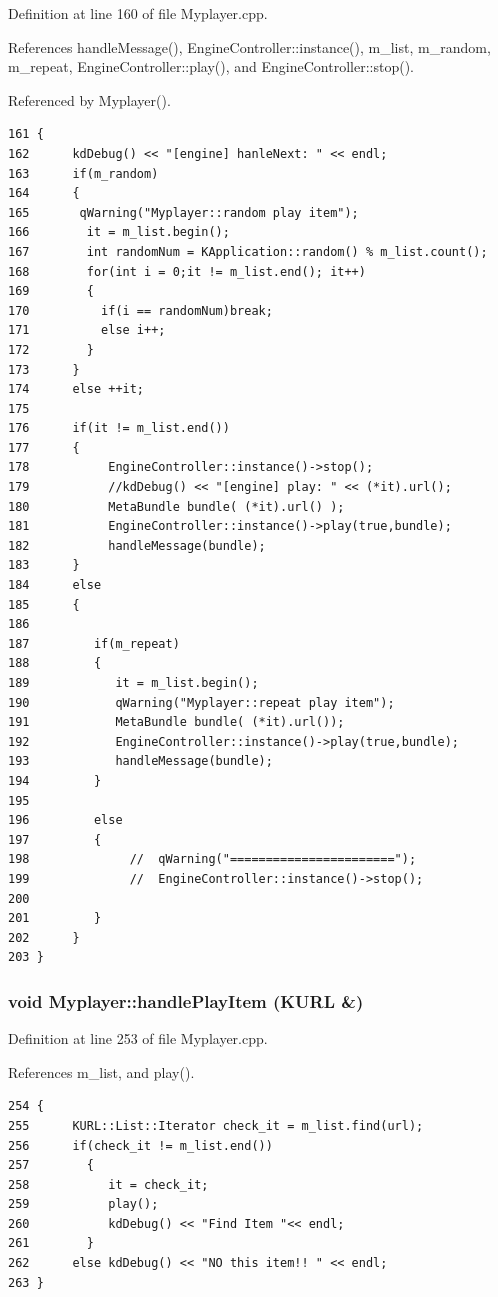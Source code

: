 Definition at line 160 of file Myplayer.cpp.

References handle\-Message(), Engine\-Controller::instance(), m\_\-list, m\_\-random, m\_\-repeat, Engine\-Controller::play(), and Engine\-Controller::stop().

Referenced by Myplayer().



\footnotesize\begin{verbatim}161 {
162      kdDebug() << "[engine] hanleNext: " << endl;
163      if(m_random)
164      {
165       qWarning("Myplayer::random play item");
166        it = m_list.begin();
167        int randomNum = KApplication::random() % m_list.count();
168        for(int i = 0;it != m_list.end(); it++)
169        {
170          if(i == randomNum)break;
171          else i++;
172        }
173      }
174      else ++it;
175    
176      if(it != m_list.end())
177      {
178           EngineController::instance()->stop();
179           //kdDebug() << "[engine] play: " << (*it).url();
180           MetaBundle bundle( (*it).url() );  
181           EngineController::instance()->play(true,bundle);     
182           handleMessage(bundle);
183      }
184      else
185      {
186         
187         if(m_repeat)
188         {
189            it = m_list.begin();
190            qWarning("Myplayer::repeat play item");
191            MetaBundle bundle( (*it).url());
192            EngineController::instance()->play(true,bundle);
193            handleMessage(bundle);
194         }
195         
196         else 
197         {      
198              //  qWarning("=======================");
199              //  EngineController::instance()->stop();  
200            
201         }
202      }
203 }
\end{verbatim}\normalsize 
{}
\subsubsection{\setlength{\rightskip}{0pt plus 5cm}void Myplayer::handle\-Play\-Item (KURL \&)\hspace{0.3cm}{\tt  [slot]}}\label{classMyplayer_Myplayeri15}




Definition at line 253 of file Myplayer.cpp.

References m\_\-list, and play().



\footnotesize\begin{verbatim}254 {
255      KURL::List::Iterator check_it = m_list.find(url);      
256      if(check_it != m_list.end())
257        {
258           it = check_it;
259           play();
260           kdDebug() << "Find Item "<< endl;
261        }
262      else kdDebug() << "NO this item!! " << endl;
263 }
\end{verbatim}\normalsize 
{}
